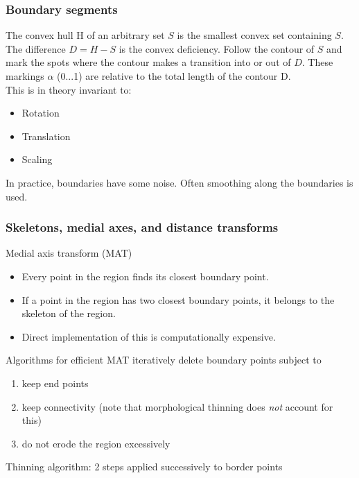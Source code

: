 \subsubsection{Boundary segments}
The convex hull H of an arbitrary set $S$ is the smallest convex set containing $S$. The difference $D=H-S$ is the convex deficiency. Follow the contour of $S$ and mark the spots where the contour makes a transition into or out of $D$. These markings $\alpha$ (0...1) are relative to the total length of the contour D.\\
This is in theory invariant to:
\begin{itemize}
\item Rotation
\item Translation
\item Scaling
\end{itemize}
In practice, boundaries have some noise. Often smoothing along the boundaries is used.

\subsubsection{Skeletons, medial axes, and distance transforms}
Medial axis transform (MAT)
\begin{itemize}
\item Every point in the region finds its closest boundary point.
\item If a point in the region has two closest boundary points, it belongs to the skeleton of the region.
\item Direct implementation of this is computationally expensive.
\end{itemize}
Algorithms for efficient MAT iteratively delete boundary points subject to
\begin{enumerate}
\item keep end points
\item keep connectivity (\small note that morphological thinning does \emph{not} account for this)
\item do not erode the region excessively
\end{enumerate}
Thinning algorithm: 2 steps applied successively to border points\\
